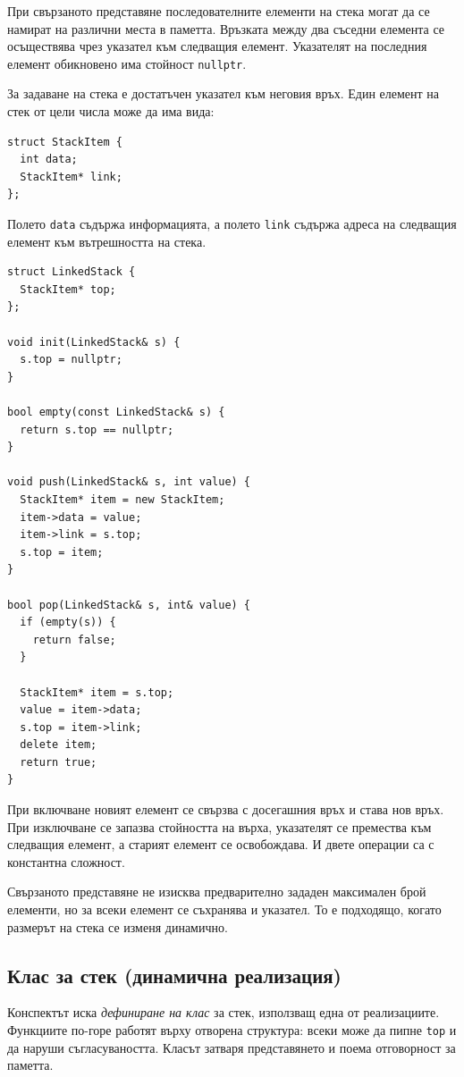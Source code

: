 При свързаното представяне последователните елементи на стека могат да се намират на различни места в паметта. Връзката между два съседни елемента се осъществява чрез указател към следващия елемент. Указателят на последния елемент обикновено има стойност \verb|nullptr|.

За задаване на стека е достатъчен указател към неговия връх. Един елемент на стек от цели числа може да има вида:

\begin{verbatim}
struct StackItem {
  int data;
  StackItem* link;
};
\end{verbatim}

Полето \verb|data| съдържа информацията, а полето \verb|link| съдържа адреса на следващия елемент към вътрешността на стека.

\begin{verbatim}
struct LinkedStack {
  StackItem* top;
};

void init(LinkedStack& s) {
  s.top = nullptr;
}

bool empty(const LinkedStack& s) {
  return s.top == nullptr;
}

void push(LinkedStack& s, int value) {
  StackItem* item = new StackItem;
  item->data = value;
  item->link = s.top;
  s.top = item;
}

bool pop(LinkedStack& s, int& value) {
  if (empty(s)) {
    return false;
  }

  StackItem* item = s.top;
  value = item->data;
  s.top = item->link;
  delete item;
  return true;
}
\end{verbatim}

При включване новият елемент се свързва с досегашния връх и става нов връх. При изключване се запазва стойността на върха, указателят се премества към следващия елемент, а старият елемент се освобождава. И двете операции са с константна сложност.

Свързаното представяне не изисква предварително зададен максимален брой елементи, но за всеки елемент се съхранява и указател. То е подходящо, когато размерът на стека се изменя динамично.


\subsection{Клас за стек (динамична реализация)}\label{s:18.3.3}

Конспектът иска \emph{дефиниране на клас} за стек, използващ една от
реализациите. Функциите по-горе работят върху отворена структура: всеки може да
пипне \verb|top| и да наруши съгласуваността. Класът затваря представянето и
поема отговорност за паметта.

